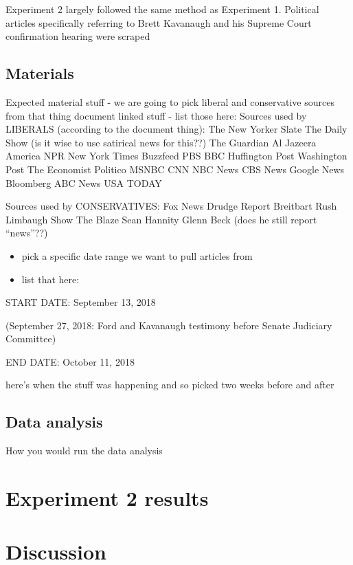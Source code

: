 \documentclass[,man]{apa6}
\providecommand{\tightlist}{%
  \setlength{\itemsep}{0pt}\setlength{\parskip}{0pt}}
\theoremstyle{definition}
\theoremstyle{definition}
\theoremstyle{definition}
\theoremstyle{remark}
\begin{document}
Experiment 2 largely followed the same method as Experiment 1. Political
articles specifically referring to Brett Kavanaugh and his Supreme Court
confirmation hearing were scraped

\hypertarget{materials-1}{%
\subsection{Materials}\label{materials-1}}

Expected material stuff - we are going to pick liberal and conservative
sources from that thing document linked stuff - list those here: Sources
used by LIBERALS (according to the document thing): The New Yorker Slate
The Daily Show (is it wise to use satirical news for this??) The
Guardian Al Jazeera America NPR New York Times Buzzfeed PBS BBC
Huffington Post Washington Post The Economist Politico MSNBC CNN NBC
News CBS News Google News Bloomberg ABC News USA TODAY

Sources used by CONSERVATIVES: Fox News Drudge Report Breitbart Rush
Limbaugh Show The Blaze Sean Hannity Glenn Beck (does he still report
\enquote{news}??)

\begin{itemize}
\tightlist
\item
  pick a specific date range we want to pull articles from
\item
  list that here:
\end{itemize}

START DATE: September 13, 2018

(September 27, 2018: Ford and Kavanaugh testimony before Senate
Judiciary Committee)

END DATE: October 11, 2018

here's when the stuff was happening and so picked two weeks before and
after

\hypertarget{data-analysis-1}{%
\subsection{Data analysis}\label{data-analysis-1}}

How you would run the data analysis

\hypertarget{experiment-2-results}{%
\section{Experiment 2 results}\label{experiment-2-results}}

\hypertarget{discussion-1}{%
\section{Discussion}\label{discussion-1}}
\end{document}
